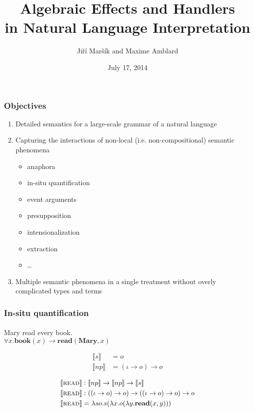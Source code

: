 \documentclass{beamer}
\newcommand{\sem}[1]{\llbracket #1 \rrbracket}
\newcommand{\semdom}[1]{\textbf{#1}}
\begin{document}
\title[Effects \& Handlers in Semantics]{Algebraic Effects and Handlers \\
  in Natural Language Interpretation}
\author{Jiří Maršík and Maxime Amblard}
\date[July 2014]{July 17, 2014}

\frame{\titlepage \setcounter{framenumber}{1}}


\begin{frame} \frametitle{Objectives}

\begin{enumerate}
\item Detailed semantics for a large-scale grammar of a natural language
  \vfill
\item Capturing the interactions of non-local (i.e. non-compositional)
  semantic phenomena
  \begin{itemize}
    \item anaphora
    \item in-situ quantification
    \item event arguments
    \item presupposition
    \item intensionalization
    \item extraction
    \item \ldots
  \end{itemize}
  \vfill
\item Multiple semantic phenomena in a single treatment without overly
  complicated types and terms
\end{enumerate}

\end{frame}


\begin{frame}
  \frametitle{In-situ quantification}
  \framesubtitle{\textcite{barker2002continuations}}

  \label{ex:quantification} Mary read every book. \\
  $\forall x. \semdom{book}(x) \to \semdom{read}(\semdom{Mary}, x)$

  \begin{align*}
  \sem{s}  &= o \\
  \sem{np} &= (\iota \to o) \to o
  \end{align*}

  \begin{align*}
  \sem{\textsc{read}} & : \sem{np} \to \sem{np} \to \sem{s} \\
  \sem{\textsc{read}} & : ((\iota \to o) \to o) \to ((\iota \to o) \to o) \to
  o \\
  \sem{\textsc{read}} & = \lambda s o. s (\lambda x. o (\lambda
  y. \textbf{read}(x, y)))
  \end{align*}
\end{frame}
\end{document}
